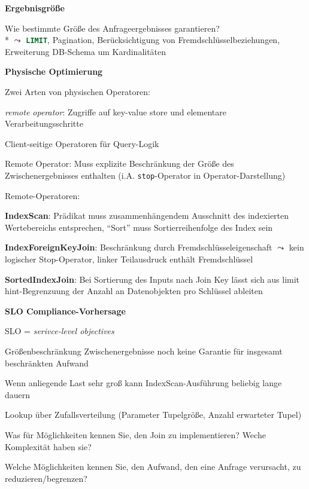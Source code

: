 \textbf{Ergebnisgröße}
\begin{items}
	\item Wie bestimmte Größe des Anfrageergebnisses garantieren?
		\\*
		\( \leadsto \) \lstinline[language=sql]{LIMIT}, Pagination, Berücksichtigung von Fremdschlüsselbeziehungen, Erweiterung DB-Schema um Kardinalitäten
\end{items}

\textbf{Physische Optimierung}
\begin{items}
	\item Zwei Arten von physischen Operatoren:
	\begin{enumeration}
		\item \emph{remote operator}: Zugriffe auf key-value store und elementare Verarbeitungsschritte
		\item Client-seitige Operatoren für Query-Logik
	\end{enumeration}
	\item Remote Operator: Muss explizite Beschränkung der Größe des Zwischenergebnisses enthalten (i.A. \lstinline{stop}-Operator in Operator-Darstellung)
	\item Remote-Operatoren:
	\begin{enumeration}
		\item \textbf{IndexScan}: Prädikat muss zusammenhängendem Ausschnitt des indexierten Wertebereichs entsprechen, ``Sort'' muss Sortierreihenfolge des Index sein
		\item \textbf{IndexForeignKeyJoin}: Beschränkung durch Fremdschlüsseleigenschaft \( \leadsto \) kein logischer Stop-Operator, linker Teilausdruck enthält Fremdschlüssel
		\item \textbf{SortedIndexJoin}: Bei Sortierung des Inputs nach Join Key lässt sich aus limit hint-Begrenzuung der Anzahl an Datenobjekten pro Schlüssel ableiten
	\end{enumeration}
\end{items}

\textbf{SLO Compliance-Vorhersage}
\begin{items}
	\item SLO = \emph{serivce-level objectives}
	\item Größenbeschränkung Zwischenergebnisse noch keine Garantie für insgesamt beschränkten Aufwand
	\item Wenn anliegende Last sehr groß kann IndexScan-Ausführung beliebig lange dauern
	\item Lookup über Zufallsverteilung (Parameter Tupelgröße, Anzahl erwarteter Tupel)
\end{items}

\begin{fragen}
	\begin{enumeration}
		\item Was für Möglichkeiten kennen Sie, den Join zu implementieren? Weche Komplexität haben sie?
		\item Welche Möglichkeiten kennen Sie, den Aufwand, den eine Anfrage verursacht, zu reduzieren/begrenzen?
	\end{enumeration}
\end{fragen}